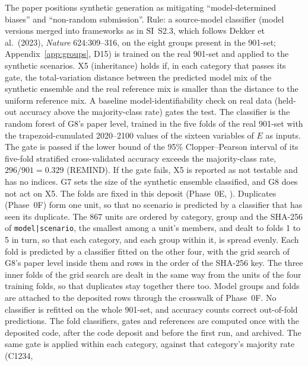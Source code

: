 \documentclass[11pt,a4paper]{article}
\newcommand{\prop}[1]{#1}
\newcommand{\prop}[1]{\textcolor{blue}{#1}}
\newcommand{\claim}[1]{\textbf{#1}}
\begin{document}
\begin{description}[style=nextline]
\item[\claim{X5} (bias inheritance, secondary).] The paper positions
  synthetic generation as mitigating ``model-determined biases'' and
  ``non-random submission''. Rule: a source-model classifier (model
  versions merged into frameworks as in SI~S2.3, which follows Dekker et
  al.\ (2023), \emph{Nature} 624:309--316, on the eight groups present in
  the 901-set; Appendix~\ref{app:groups}, D15) is trained on the real
  901-set and applied to the synthetic scenarios. X5 (inheritance) holds
  if, in each category that passes its gate, the total-variation
  distance between the predicted model mix of the synthetic ensemble and
  the real reference mix is smaller than the distance to the
  uniform reference mix. A baseline model-identifiability check on
  real data (held-out accuracy above the majority-class rate) gates the
  test. The classifier is the random forest of G8's paper level, trained
  in the five folds of the real 901-set with the trapezoid-cumulated
  2020--2100 values of the sixteen variables of $E$ as inputs. The gate is
  passed if the lower bound of the 95\% Clopper--Pearson interval of
  its five-fold stratified cross-validated accuracy exceeds the
  majority-class rate, $296/901=0.329$ (REMIND). If the gate fails,
  X5 is reported as not testable and has no indices. G7 sets the size of
  the synthetic ensemble classified, and G8 does not act on X5. The
  folds are fixed in this deposit (Phase~0E,
  ). \prop{Duplicates (Phase~0F)
  form one unit, so that no scenario is predicted by a classifier that has
  seen its duplicate. The 867 units are ordered by category, group and the
  SHA-256 of \texttt{model|scenario}, the smallest among a unit's members,}
  and dealt to folds 1 to 5 in turn, so that each category, and each group
  within it, is spread evenly. Each fold is predicted by a classifier fitted
  on the other four, with the grid search of G8's paper level inside them
  and rows in the order of the SHA-256 \prop{key. The three inner folds of
  the grid search are dealt in the same way from the units of the four
  training folds, so that duplicates stay together there too. Model groups
  and folds are attached to the deposited rows through the crosswalk of
  Phase~0F.}
  No classifier is refitted on the whole 901-set, and accuracy counts
  correct out-of-fold predictions. The fold classifiers, gates and
  references are computed once with the deposited code, after the code
  deposit and before the first run, and archived. The same gate is applied
  within each category, against that category's majority rate (C1234,

\end{description}
\end{document}
